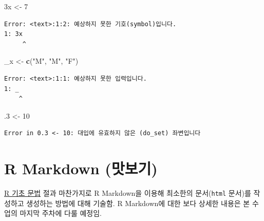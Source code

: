 \documentclass[
  11pt,
]{krantz}
\newenvironment{Shaded}{\begin{snugshade}}{\end{snugshade}}
\newcommand{\DecValTok}[1]{\textcolor[rgb]{0.06,0.06,0.06}{#1}}
\newcommand{\FloatTok}[1]{\textcolor[rgb]{0.06,0.06,0.06}{#1}}
\newcommand{\KeywordTok}[1]{\textcolor[rgb]{0.27,0.27,0.27}{\textbf{#1}}}
\newcommand{\NormalTok}[1]{#1}
\newcommand{\StringTok}[1]{\textcolor[rgb]{0.5,0.5,0.5}{#1}}
\let\BeginKnitrBlock\begin \let\EndKnitrBlock\end
\begin{document}
\footnotesize

\begin{Shaded}
\begin{Highlighting}[]
\NormalTok{3x <-}\StringTok{ }\DecValTok{7}
\end{Highlighting}
\end{Shaded}

\begin{verbatim}
Error: <text>:1:2: 예상하지 못한 기호(symbol)입니다.
1: 3x
     ^
\end{verbatim}

\normalsize

\footnotesize

\begin{Shaded}
\begin{Highlighting}[]
\NormalTok{_x <-}\StringTok{ }\KeywordTok{c}\NormalTok{(}\StringTok{"M"}\NormalTok{, }\StringTok{"M"}\NormalTok{, }\StringTok{"F"}\NormalTok{)}
\end{Highlighting}
\end{Shaded}

\begin{verbatim}
Error: <text>:1:1: 예상하지 못한 입력입니다.
1: _
    ^
\end{verbatim}

\normalsize

\footnotesize

\begin{Shaded}
\begin{Highlighting}[]
\FloatTok{.3}\NormalTok{ <-}\StringTok{ }\DecValTok{10}
\end{Highlighting}
\end{Shaded}

\begin{verbatim}
Error in 0.3 <- 10: 대입에 유효하지 않은 (do_set) 좌변입니다
\end{verbatim}

\normalsize

\hypertarget{r-markdown-get-start}{%
\section{R Markdown (맛보기)}\label{r-markdown-get-start}}

\footnotesize

\BeginKnitrBlock{rmdnote}
\protect\hyperlink{r-basic}{R 기초 문법} 절과 마찬가지로 R Markdown을 이용해 최소한의 문서(\texttt{html} 문서)를 작성하고 생성하는 방법에 대해 기술함. R Markdown에 대한 보다 상세한 내용은 본 수업의 마지막 주차에 다룰 예정임.
\EndKnitrBlock{rmdnote}
\end{document}
